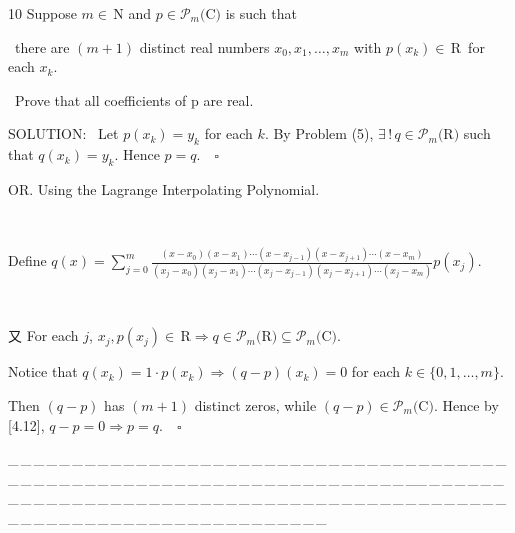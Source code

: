 \documentclass[a4paper, 11pt, UTF8]{article}
\def\Po{\mathcal{P}}
\def\Rbfc{$\,{\timesbf R}$}
\begin{document}
\begin{large}
{\timesbf\Large 10} {\timessl\Large 
Suppose $m\in${\,\timesbf N} and $p\in\Po_m(${\timesbf C}$)$ is such that}\par\quad\,
{\timessl\Large there are $(m+1)$ distinct real numbers $x_0,x_1,\dots,x_m$ with $p(x_k)\in\Rbfc\,$ for each $x_k$.}\par\quad\,
{\timessl\Large Prove that all coefficients of p are real.
}\par
{\timesbf S\footnotesize{OLUTION:}}\,\,\,
Let $p(x_k)=y_k$ for each $k$.
By Problem (5), $\exists\,!\,q\in\Po_m(${\timesbf R}$)$ such that $q(x_k)=y_k.$ Hence $p=q.\quad\square$\par\quad
O{\small R}. Using the Lagrange Interpolating Polynomial.\par{\tiny\,\par}\quad
Define $q(x)=\displaystyle\sum\limits_{j=0}^m\frac{(x-x_0)(x-x_1)\cdots(x-x_{j-1})(x-x_{j+1})\cdots(x-x_m)}{(x_j-x_0)(x_j-x_1)\cdots(x_j-x_{j-1})(x_j-x_{j+1})\cdots(x_j-x_m)}p(x_j).$\par{\tiny\,\par}\quad
又 For each $j$, $x_j,p(x_j)\in\Rbfc\Rightarrow q\in\Po_m(${\timesbf R}$)\subseteq\Po_m(${\timesbf C}$).$\par\quad
Notice that $q(x_k)=1\cdot p(x_k)\Rightarrow (q-p)(x_k)=0$ for each $k\in\{0,1,\dots,m\}.$\par\quad
Then $(q-p)$ has $(m+1)$ distinct zeros, while $(q-p)\in\Po_m(${\timesbf C}$)$. Hence by [4.12], $q-p=0\Rightarrow p=q.\quad\square$
\par
{\tiny \_\,\_\,\_\,\_\,\_\,\_\,\_\,\_\,\_\,\_\,\_\,\_\,\_\,\_\,\_\,\_\,\_\,\_\,\_\,\_\,\_\,\_\,\_\,\_\,\_\,\_\,\_\,\_\,\_\,\_\,\_\,\_\,\_\,\_\,\_\,\_\,\_\,\_\,\_\,\_\,\_\,\_\,\_\,\_\,\_\,\_\,\_\,\_\,\_\,\_\,\_\,\_\,\_\,\_\,\_\,\_\,\_\,\_\,\_\,\_\,\_\,\_\,\_\,\_\,\_\,\_\,\_\,\_\,\_\,\_\,\_\_\,\_\,\_\,\_\,\_\,\_\,\_\,\_\,\_\,\_\,\_\,\_\,\_\,\_\,\_\,\_\,\_\,\_\,\_\,\_\,\_\,\_\,\_\,\_\,\_\,\_\,\_\,\_\,\_\,\_\,\_\,\_\,\_\,\_\,\_\,\_\,\_\,\_\,\_\,\_\,\_\,\_\,\_\,\_\,\_\,\_\,\_\,\_\,\_\,\_\,\_\,\_\,\_\,\_\,\_\,\_\,\_\,\_\,\_\,\_\,\_\,\_\,\_\,\_\,\_\,\_\,\_\,\_\,\_\,\_\,\_}\par


\end{large}
\end{document}

